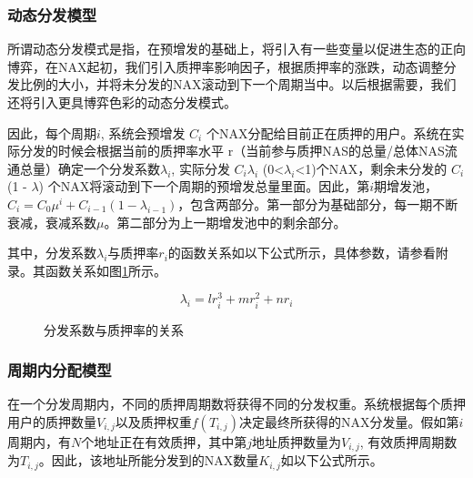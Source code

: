 \subsubsection{动态分发模型}
所谓动态分发模式是指，在预增发的基础上，将引入有一些变量以促进生态的正向博弈，在NAX起初，我们引入质押率影响因子，根据质押率的涨跌，动态调整分发比例的大小，并将未分发的NAX滚动到下一个周期当中。以后根据需要，我们还将引入更具博弈色彩的动态分发模式。

因此，每个周期$i$, 系统会预增发 $C_i$ 个NAX分配给目前正在质押的用户。系统在实际分发的时候会根据当前的质押率水平 r（当前参与质押NAS的总量/总体NAS流通总量）确定一个分发系数$\lambda_i$, 实际分发 $C_i$$\lambda_i$ (0<$\lambda_i$<1)个NAX，剩余未分发的 $C_i$(1 - $\lambda$) 个NAX将滚动到下一个周期的预增发总量里面。因此，第\(i\)期增发池，\(C_i = C_0 \mu^i + C_{i-1} (1-\lambda_{i-1})\)，包含两部分。第一部分为基础部分，每一期不断衰减，衰减系数$\mu$。第二部分为上一期增发池中的剩余部分。


其中，分发系数\(\lambda_i\)与质押率\(r_i\)的函数关系如以下公式所示，具体参数，请参看附录。其函数关系如图\ref{func}所示。

  \begin{equation}
    \lambda_i = l r_i^3 + m r_i^2 + n r_i
  \end{equation}

\begin{figure}
\centering
    \caption{分发系数与质押率的关系}\label{func}
\end{figure}



\subsubsection{周期内分配模型}
在一个分发周期内，不同的质押周期数将获得不同的分发权重。系统根据每个质押用户的质押数量$V_{i,j}$以及质押权重\(f(T_{i,j})\)决定最终所获得的NAX分发量。假如第$i$周期内，有$N$个地址正在有效质押，其中第$j$地址质押数量为$V_{i,j}$, 有效质押周期数为$T_{i,j}$。因此，该地址所能分发到的NAX数量$K_{i,j}$如以下公式所示。

